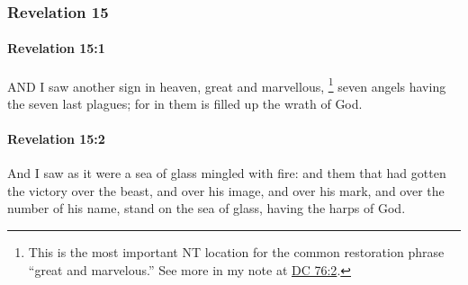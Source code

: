	\subsubsection{Revelation 15} %
		\label{REVELATIONNT-15}
		
		\paragraph{Revelation 15:1} %
			\label{REVELATIONNT-15-1}

			AND I saw another sign in heaven, great and marvellous,%
				\footnote{%
					This is the most important NT location for the common restoration phrase ``great and marvelous.'' See more in my note at \hyperref[DC76-2]{DC 76:2}.
					}
			seven angels having the seven last plagues; for in them is filled up the wrath of God.

			\begin{framed}
			\scriptsize
				\begin{compactdesc}
					\item[SBLG] 
				\end{compactdesc}
			\end{framed}

		\paragraph{Revelation 15:2} %
			\label{REVELATIONNT-15-2}

			And I saw as it were a sea of glass mingled with fire: and them that had gotten the victory over the beast, and over his image, and over his mark, and over the number of his name, stand on the sea of glass, having the harps of God.

